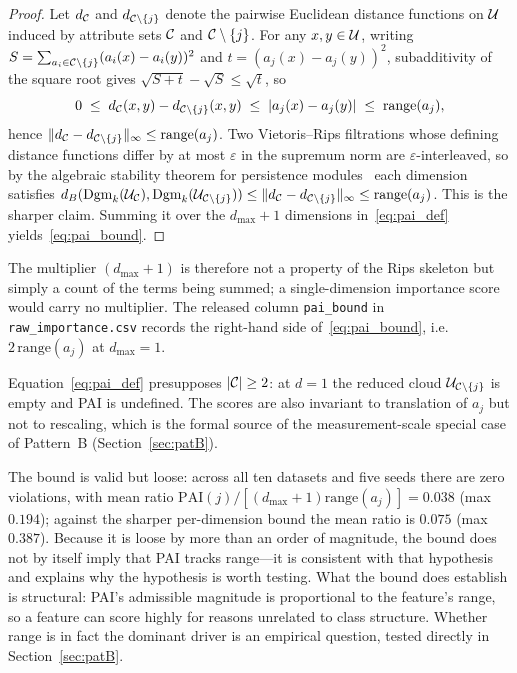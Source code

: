 \begin{proof}
Let $d_{\mathcal{C}}$ and $d_{\mathcal{C}\setminus\{j\}}$ denote the pairwise Euclidean distance
functions on $\mathcal{U}$ induced by attribute sets $\mathcal{C}$ and $\mathcal{C}\setminus\{j\}$.  For
any $x,y\in\mathcal{U}$, writing $S=\sum_{a_i\in\mathcal{C}\setminus\{j\}}(a_i(x)-a_i(y))^2$ and
$t=(a_j(x)-a_j(y))^2$, subadditivity of the square root gives
$\sqrt{S+t}-\sqrt{S}\leq\sqrt{t}$, so
\[
  0 \;\leq\; d_{\mathcal{C}}(x,y) - d_{\mathcal{C}\setminus\{j\}}(x,y)
    \;\leq\; |a_j(x)-a_j(y)| \;\leq\; \mathrm{range}(a_j),
\]
hence $\|d_{\mathcal{C}}-d_{\mathcal{C}\setminus\{j\}}\|_\infty \leq \mathrm{range}(a_j)$.
Two Vietoris--Rips filtrations whose defining distance functions differ by at
most $\varepsilon$ in the supremum norm are $\varepsilon$-interleaved, so by
the algebraic stability theorem for persistence
modules~\cite{CohenSteiner2007stability,Chazal2009Stability} each dimension
satisfies
$d_B(\mathrm{Dgm}_k(\mathcal{U}_{\mathcal{C}}),\mathrm{Dgm}_k(\mathcal{U}_{\mathcal{C}\setminus\{j\}}))
\leq \|d_{\mathcal{C}}-d_{\mathcal{C}\setminus\{j\}}\|_\infty \leq \mathrm{range}(a_j)$.
This is the sharper claim.  Summing it over the $d_{\max}+1$ dimensions
in~\eqref{eq:pai_def} yields~\eqref{eq:pai_bound}.
\end{proof}

The multiplier $(d_{\max}+1)$ is therefore not a property of the Rips
skeleton but simply a count of the terms being summed; a single-dimension
importance score would carry no multiplier.  The released column
\texttt{pai\_bound} in \texttt{raw\_importance.csv} records the right-hand
side of~\eqref{eq:pai_bound}, i.e.\ $2\,\mathrm{range}(a_j)$ at
$d_{\max}=1$.

\begin{remark}
\label{rem:pai_domain}
Equation~\eqref{eq:pai_def} presupposes $|\mathcal{C}|\geq 2$: at $d=1$ the reduced
cloud $\mathcal{U}_{\mathcal{C}\setminus\{j\}}$ is empty and PAI is undefined.  The scores are
also invariant to translation of $a_j$ but not to rescaling, which is the
formal source of the measurement-scale special case of Pattern~B
(Section~\ref{sec:patB}).
\end{remark}

The bound is valid but loose: across all ten datasets and five seeds there
are zero violations, with mean ratio
$\mathrm{PAI}(j)/[(d_{\max}+1)\mathrm{range}(a_j)] = 0.038$ (max $0.194$);
against the sharper per-dimension bound the mean ratio is $0.075$
(max $0.387$).  Because it is loose by more than an order of magnitude, the
bound does not by itself imply that PAI tracks range---it is consistent with
that hypothesis and explains why the hypothesis is worth testing.  What the
bound does establish is structural: PAI's admissible magnitude is
proportional to the feature's range, so a feature can score highly for
reasons unrelated to class structure.  Whether range is in fact the dominant
driver is an empirical question, tested directly in Section~\ref{sec:patB}.

